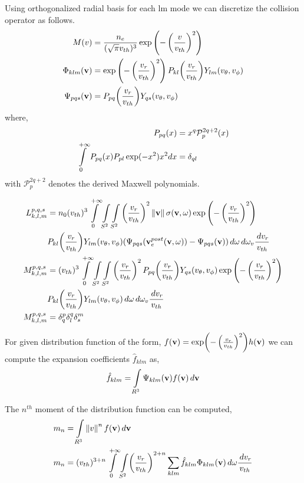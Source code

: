 \documentclass{article}[draft]
\begin{document}
Using orthogonalized radial basis for each lm mode we can discretize the collision operator as follows. 
\begin{align*}
M(v) & = \frac{n_e}{(\sqrt{\pi}v_{th})^3} \exp{\left(-\left(\frac{v}{v_{th}}\right)^2 \right)} \\
\Phi_{klm} (\vect{v}) &= \exp\left(-\left(\frac{v_r}{v_{th}}\right) ^ 2\right)  P_{kl}\of{\frac{v_r}{v_{th}}} Y_{lm}(v_\theta,v_\phi) \\
\Psi_{pqs} (\vect{v}) &= P_{pq}\of{\frac{v_r}{v_{th}}} Y_{qs}(v_\theta,v_\phi)
\end{align*} where, 
\begin{align*}
	P_{pq}\of{x}  &= x^q \mathcal{P}^{2q+2}_p(x)  \\
   \myint_{0}^{+\infty} P_{pq}\of{x} P_{pl} \exp(-x^2) x^2 dx &= \delta_{ql}
\end{align*} with $\mathcal{P}^{2q+2}_p$ denotes the derived Maxwell polynomials. 


\begin{align*}
{L}_{k,l,m}^{p,q,s} &=n_0 (v_{th})^3 \myint_{0}^{+\infty} \myint_{S^2} \myint_{S^2} \left(\frac{v_r}{v_{th}}\right)^{2} \norm{\vect{v}} \sigma(\vect{v},\omega) \exp\left(-\left(\frac{v_r}{v_{th}}\right) ^ 2\right) \\
&P_{kl}\of{\frac{v_r}{v_{th}}} Y_{lm}(v_\theta,v_\phi)  (\Psi_{pqs}(\vect{v}_e^{post}(\vect{v},\omega)) - \Psi_{pqs}(\vect{v})) \diff{\omega} \diff{\omega_v} \frac{\diff{v_r}}{v_{th}} \\
{M}_{k,l,m}^{p,q,s} &= (v_{th})^3 \myint_{0}^{+\infty} \myint_{S^2} \myint_{S^2} 
 \left(\frac{v_r}{v_{th}}\right)^{2} P_{pq}\of{\frac{v_r}{v_{th}}} Y_{qs}(v_\theta,v_\phi) \exp\left(-\left(\frac{v_r}{v_{th}}\right) ^ 2\right)  \\& P_{kl}\of{\frac{v_r}{v_{th}}} Y_{lm}(v_\theta,v_\phi) \diff{\omega} \diff{\omega_v} \frac{\diff{v_r}}{v_{th}} \\
 {M}_{k,l,m}^{p,q,s} &= \delta^p_q \delta^q_l \delta^m_s
\end{align*}

For given distribution function of the form, $f(\vect{v}) = \exp\of{-\left(\frac{v_r}{v_{th}}\right)^2}h(\vect{v})$ we can compute the expansion coefficients $\hat{f}_{klm}$ as, 
\begin{align*}
	\hat{f}_{klm} = \int\limits_{R^3} \Psi_{klm}(\mathbf{v}) f(\mathbf{v}) \, d\mathbf{v}
\end{align*}

The $n^{th}$ moment of the distribution function can be computed,
\begin{align*}
	m_n&=\myint_{R^3} \norm{v}^n f(\vect{v}) \diff{\vect{v}}\\
	m_n&=(v_{th})^{3+n}\myint_{0}^{+\infty} \myint_{S^2} \of{\frac{v_r}{v_{th}}}^{2+n} \sum_{klm} \hat{f}_{klm} \Phi_{klm}(\vect{v}) \diff{\omega}\frac{\diff{v_r}}{v_{th}}
\end{align*}
\end{document}
